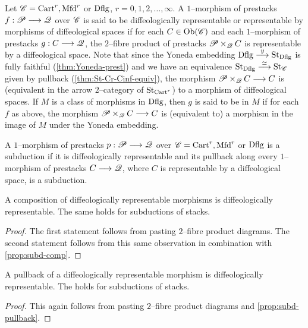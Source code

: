 \documentclass[11pt]{amsart}
\begin{document}
\begin{defn}
Let $\mathscr{C} = \mathrm{Cart}^r, \mathrm{Mfd}^r$ or $\mathrm{Dflg}$, $r = 0, 1, 2, \dots, \infty$.
A $1$--morphism of prestacks $f : \sP \to \sQ$ over $\mathscr{C}$ is said to be diffeologically
representable or representable by morphisms of diffeological spaces if for each $C \in \Ob{\sC}$ and
each $1$--morphism of prestacks $g : C \to \sQ$, the $2$--fibre product of prestacks
$\mathscr{P} \times_\mathscr{Q} C$ is representable by a diffeological space.
Note that since the Yoneda embedding $\Dflg \to[y] \St_{\Dflg}$ is fully faithful
(\cref{thm:Yoneda-prest})
and we have an equivalence $\St_{\Dflg} \to[\simeq] \St_{\sC}$ given by pullback
(\cref{thm:St-Cr-Cinf-equiv}),
the morphism $\sP \times_\sQ C \to C$ is (equivalent in the arrow $2$--category of $\mathrm{St}_{\mathrm{Cart}^r}$)
to a morphism of diffeological spaces.
If $M$ is a class of morphisms in $\mathrm{Dflg}$, then $g$ is said to be
in $M$ if for each $f$ as above, the morphism $\sP \times_\sQ C \to C$ is (equivalent to) a
morphism in the image of $M$ under the Yoneda embedding.
\end{defn}

\begin{exm}
A $1$--morphism of prestacks $p : \sP \to \sQ$ over $\mathscr{C} = \mathrm{Cart}^r, \mathrm{Mfd}^r$ or $\mathrm{Dflg}$
is a subduction if it is diffeologically representable and its pullback along every $1$--morphism
of prestacks $C \to \sQ$, where $C$ is representable by a diffeological space, is a subduction.
\end{exm}

\begin{prop}\label{prop:subd-st-comp}
A composition of diffeologically representable morphisms is diffeologically representable.
The same holds for subductions of stacks.
\end{prop}
\begin{proof}
The first statement follows from pasting $2$--fibre product diagrams.
The second statement follows from this same observation in combination with \cref{prop:subd-comp}.
\end{proof}

\begin{prop}\label{prop:subd-st-pullback}
A pullback of a diffeologically representable morphism is diffeologically representable.
The holds for subductions of stacks.
\end{prop}
\begin{proof}
This again follows from pasting $2$--fibre product diagrams and
\cref{prop:subd-pullback}.
\end{proof}
\end{document}
